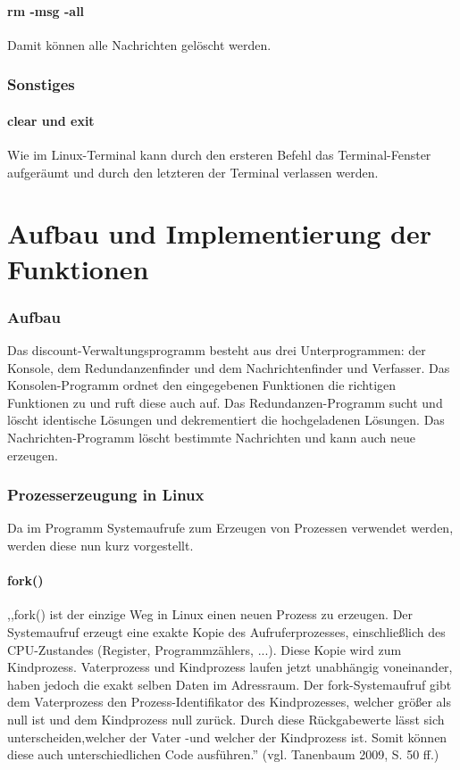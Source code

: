 \documentclass[12pt]{report}
\begin{document}
\subsubsection{rm -msg -all}
Damit können alle Nachrichten gelöscht werden.


\subsection{Sonstiges}

\subsubsection{clear und exit}
Wie im Linux-Terminal kann durch den ersteren Befehl das Terminal-Fenster aufgeräumt und durch den letzteren der Terminal verlassen werden. 


\chapter{Aufbau und Implementierung der Funktionen}

\subsection{Aufbau}
Das discount-Verwaltungsprogramm besteht aus drei Unterprogrammen: der Konsole, dem Redundanzenfinder und dem Nachrichtenfinder und Verfasser. Das Konsolen-Programm ordnet den eingegebenen Funktionen die richtigen Funktionen zu und ruft diese auch auf. Das Redundanzen-Programm sucht und löscht identische Lösungen und dekrementiert die hochgeladenen Lösungen. Das Nachrichten-Programm löscht bestimmte Nachrichten und kann auch neue erzeugen.

\subsection{Prozesserzeugung in Linux}
Da im Programm Systemaufrufe zum Erzeugen von Prozessen verwendet werden, werden diese nun kurz vorgestellt.

\subsubsection{fork()}
,,fork() ist der einzige Weg in Linux einen neuen Prozess zu erzeugen. Der Systemaufruf erzeugt eine exakte Kopie des Aufruferprozesses, einschließlich des CPU-Zustandes (Register, Programmzählers, ...). Diese Kopie wird zum Kindprozess. Vaterprozess und Kindprozess laufen jetzt unabhängig voneinander, haben jedoch die exakt selben Daten im Adressraum. Der fork-Systemaufruf gibt dem Vaterprozess den Prozess-Identifikator des Kindprozesses, welcher größer als null ist und dem Kindprozess null zurück. Durch diese Rückgabewerte lässt sich unterscheiden,welcher der Vater -und welcher der Kindprozess ist. Somit können diese auch unterschiedlichen Code ausführen.'' (vgl. Tanenbaum 2009, S. 50 ff.\nocite{OS})
\end{document}

